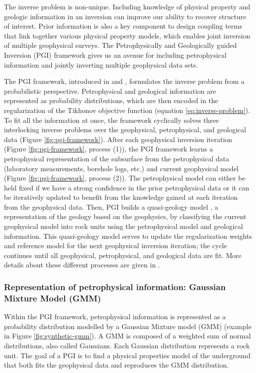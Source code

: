 \documentclass[
    paper,
  ]{geophysics}
\begin{document}
The inverse problem is non-unique. Including knowledge of physical property and geologic information in an inversion can improve our ability to recover structure of interest. Prior information is also a key component to design coupling terms that link together various physical property models, which enables joint inversion of multiple geophysical surveys. The  Petrophysically and Geologically guided Inversion (PGI) framework gives us an avenue for including petrophysical information and jointly inverting multiple geophysical data sets.




The PGI framework, introduced in \citep{Astic2019} and \citep{Astic2020}, formulates the inverse problem from a probabilistic perspective. Petrophysical and geological information are represented as probability distributions, which are then encoded in the regularization of the Tikhonov objective function (equation \ref{eq:inverse-problem}). To fit all the information at once, the framework cyclically solves three interlocking inverse problems over the geophysical, petrophysical, and geological data (Figure \ref{fig:pgi-framework}). After each geophysical inversion iteration (Figure \ref{fig:pgi-framework}, process (1)), the PGI framework learns a petrophysical representation of the subsurface from the petrophysical data (laboratory measurements, borehole logs, etc.) and current geophysical model (Figure \ref{fig:pgi-framework}, process (2)). The petrophysical model can either be held fixed if we have a strong confidence in the prior petrophysical data or it can be iteratively updated to benefit from the knowledge gained at each iteration from the geophysical data. Then, PGI builds a quasi-geology model \citep{Li2019}, a representation of the geology based on the geophysics, by classifying the current geophysical model into rock units using the petrophysical model and geological information. This quasi-geology model serves to update the regularization weights and reference model for the next geophysical inversion iteration; the cycle continues until all geophysical, petrophysical, and geological data are fit. More details about these different processes are given in \citep{Astic2019}.

\subsubsection{Representation of petrophysical information: Gaussian Mixture Model (GMM)}

Within the PGI framework, petrophysical information is represented as a probability distribution modelled by a Gaussian Mixture model (GMM)  (example in Figure \ref{fig:synthetic-gmm}). A GMM is composed of a weighted sum of normal distributions, also called Gaussians. Each Gaussian distribution represents a rock unit. The goal of a PGI is to find a physical properties model of the underground that both fits the geophysical data and reproduces the GMM distribution.
\end{document}
